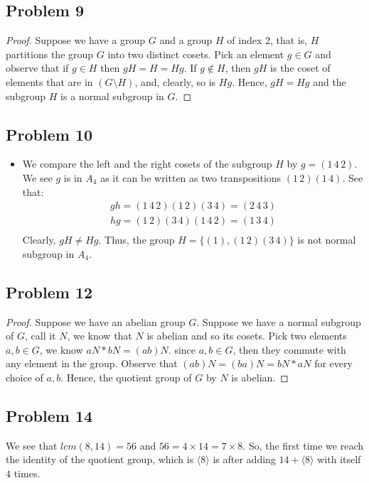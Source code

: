 \documentclass[a4paper,12pt]{article}
\begin{document}
\subsection*{Problem 9}
\begin{proof}
  Suppose we have a group $G$ and a group $H$ of index 2, that is, $H$ partitions the group $G$ into two distinct cosets. Pick an element $g \in G$ and observe that if $g \in H$ then $gH=H=Hg$. If $g \notin H$, then $gH$ is the coset of elements that are in $(G \setminus H)$, and, clearly, so is $Hg$.
  Hence, $gH=Hg$ and the subgroup $H$ is a normal subgroup in $G$.
\end{proof}
\subsection*{Problem 10}
\begin{itemize}
    \item [a)] We compare the left and the right cosets of the subgroup $H$ by $g =(1 \, 4 \, 2)$. We see $g$ is in $A_4$ as it can be written as two transpositions $(1 \, 2) (1 \, 4).$ See that:
    \begin{align*}
      gh= (1 \, 4 \, 2) (1 \, 2)(3 \, 4) = (2 \, 4 \, 3)\\
      hg =(1 \, 2) (3 \, 4) (1 \, 4 \, 2)=(1 \, 3 \, 4)\\
    \end{align*}
    Clearly, $gH \ne Hg$. Thus, the group $H=\{(1), (1 \, 2)(3 \, 4)\}$ is not normal subgroup in $A_4.$
\end{itemize}
\subsection*{Problem 12}
\begin{proof}
  Suppose we have an abelian group $G.$ Suppose we have a normal subgroup of $G$, call it $N$, we know that $N$ is abelian and so its cosets. Pick two elements $a,b \in G$, we know $aN * bN=(ab)N.$ since $a,b\in G$, then they commute with any element in the group. Observe that $(ab)N=(ba)N=bN * aN$ for every choice of $a, b.$ Hence, the quotient group of $G$ by $N$ is abelian.
\end{proof}
\subsection*{Problem 14}
We see that $lcm(8, 14)=56$ and $56 = 4 \times 14=7 \times 8.$ So, the first time we reach the identity of the quotient group, which is $\langle 8 \rangle$ is after adding $14+\langle 8 \rangle$ with itself $4$ times.
\end{document}
